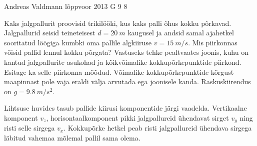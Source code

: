 {Andreas Valdmann} %
{lõppvoor} %
{2013} %
{G 9} %
{8} %
{
\ifStatement
Kaks jalgpallurit proovisid trikilööki, kus kaks palli õhus kokku põrkavad.
Jalgpallurid seisid teineteisest $d = \SI{20}{m}$ kaugusel ja andsid samal ajahetkel
sooritatud löögiga kumbki oma pallile algkiiruse $v = \SI{15}{m/s}$. Mis piirkonnas võisid pallid lennul kokku põrgata?
Vastuseks tehke pealtvaates joonis, kuhu on kantud jalgpallurite
asukohad ja kõikvõimalike kokkupõrkepunktide piirkond. Esitage ka selle
piirkonna mõõdud. Võimalike kokkupõrkepunktide kõrgust maapinnast pole
vaja eraldi välja arvutada ega joonisele kanda. Raskuskiirendus
on $g = \SI{9,8}{m/s^2}$. 
\fi


\ifHint
Lihtsuse huvides tasub pallide kiirusi komponentide järgi vaadelda. Vertikaalne komponent $v_z$, horisontaalkomponent pikki jalgpallureid ühendavat sirget $v_y$ ning risti selle sirgega $v_x$. Kokkupõrke hetkel peab risti jalgpallureid ühendava sirgega läbitud vahemaa mõlemal pallil sama olema.
\fi


}
